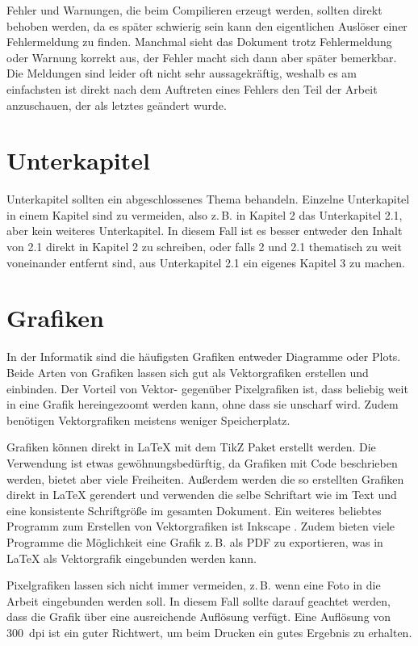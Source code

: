 Fehler und Warnungen, die beim Compilieren erzeugt werden, sollten direkt behoben werden, da es später schwierig sein kann den eigentlichen Auslöser einer Fehlermeldung zu finden. Manchmal sieht das Dokument trotz Fehlermeldung oder Warnung korrekt aus, der Fehler macht sich dann aber später bemerkbar. Die Meldungen sind leider oft nicht sehr aussagekräftig, weshalb es am einfachsten ist direkt nach dem Auftreten eines Fehlers den Teil der Arbeit anzuschauen, der als letztes geändert wurde.

\section{Unterkapitel}
Unterkapitel sollten ein abgeschlossenes Thema behandeln. Einzelne Unterkapitel in einem Kapitel sind zu vermeiden, also z.\,B. in Kapitel 2 das Unterkapitel 2.1, aber kein weiteres Unterkapitel. In diesem Fall ist es besser entweder den Inhalt von 2.1 direkt in Kapitel 2 zu schreiben, oder falls 2 und 2.1 thematisch zu weit voneinander entfernt sind, aus Unterkapitel 2.1 ein eigenes Kapitel 3 zu machen.

\section{Grafiken}
In der Informatik sind die häufigsten Grafiken entweder Diagramme oder Plots. Beide Arten von Grafiken lassen sich gut als Vektorgrafiken erstellen und einbinden. Der Vorteil von Vektor- gegenüber Pixelgrafiken ist, dass beliebig weit in eine Grafik hereingezoomt werden kann, ohne dass sie unscharf wird. Zudem benötigen Vektorgrafiken meistens weniger Speicherplatz.

Grafiken können direkt in \LaTeX{} mit dem TikZ Paket erstellt werden. Die Verwendung ist etwas gewöhnungsbedürftig, da Grafiken mit Code beschrieben werden, bietet aber viele Freiheiten. Außerdem werden die so erstellten Grafiken direkt in \LaTeX{} gerendert und verwenden die selbe Schriftart wie im Text und eine konsistente Schriftgröße im gesamten Dokument. Ein weiteres beliebtes Programm zum Erstellen von Vektorgrafiken ist Inkscape . Zudem bieten viele Programme die Möglichkeit eine Grafik z.\,B. als PDF zu exportieren, was in \LaTeX{} als Vektorgrafik eingebunden werden kann.

Pixelgrafiken lassen sich nicht immer vermeiden, z.\,B. wenn eine Foto in die Arbeit eingebunden werden soll. In diesem Fall sollte darauf geachtet werden, dass die Grafik über eine ausreichende Auflösung verfügt. Eine Auflösung von 300~dpi ist ein guter Richtwert, um beim Drucken ein gutes Ergebnis zu erhalten.

